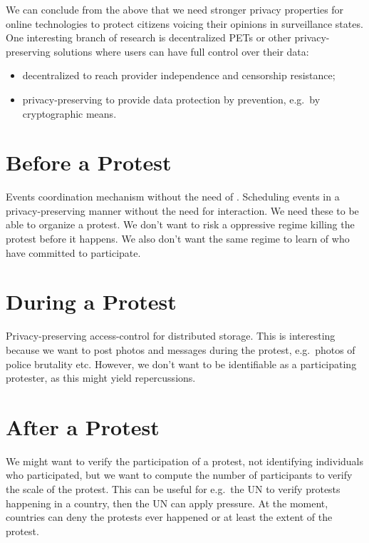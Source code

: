 \documentclass[a4paper]{llncs}
\begin{document}
We can conclude from the above that we need stronger privacy properties for 
online technologies to protect citizens voicing their opinions in surveillance 
states.
One interesting branch of research is decentralized \acp{PET} or other 
privacy-preserving solutions where users can have full control over their data:
\begin{itemize}
  \item decentralized to reach provider independence and censorship resistance;
  \item privacy-preserving to provide data protection by prevention, e.g.\ by 
    cryptographic means.
\end{itemize}


\section{Before a Protest}

Events coordination mechanism without the need of .
Scheduling events in a privacy-preserving manner without the need for 
interaction.
We need these to be able to organize a protest.
We don't want to risk a oppressive regime killing the protest before it 
happens.
We also don't want the same regime to learn of who have committed to 
participate.


\section{During a Protest}

Privacy-preserving access-control for distributed storage.
This is interesting because we want to post photos and messages during the 
protest, e.g.\ photos of police brutality etc.
However, we don't want to be identifiable as a participating protester, as this 
might yield repercussions.


\section{After a Protest}

We might want to verify the participation of a protest, not identifying 
individuals who participated, but we want to compute the number of participants 
to verify the scale of the protest.
This can be useful for e.g.\ the UN to verify protests happening in a country, 
then the UN can apply pressure.
At the moment, countries can deny the protests ever happened or at least the 
extent of the protest.
\end{document}
